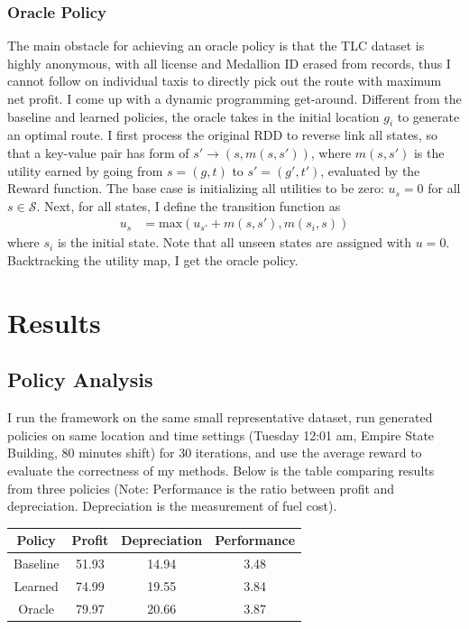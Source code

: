 \documentclass[letterpaper, 10 pt, conference]{ieeeconf}
\begin{document}
\subsubsection{Oracle Policy}
The main obstacle for achieving an oracle policy is that the TLC dataset is highly anonymous, with all license and Medallion ID erased from records, thus I cannot follow on individual taxis to directly pick out the route with maximum net profit. I come up with a dynamic programming get-around. Different from the baseline and learned policies, the oracle takes in the initial location $g_i$ to generate an optimal route. I first process the original RDD to reverse link all states, so that a key-value pair has form of $s'\to(s,m(s,s'))$, where $m(s,s')$ is the utility earned by going from $s=(g,t)$ to $s'=(g',t')$, evaluated by the Reward function. The base case is initializing all utilities to be zero: $u_s=0$ for all $s\in\mathcal{S}$. Next, for all states, I define the transition function as
\begin{align}
u_s &= \text{max}(u_{s'}+m(s, s'), m(s_i, s))
\end{align}
where $s_i$ is the initial state. Note that all unseen states are assigned with $u=0$. Backtracking the utility map, I get the oracle policy.
\section{Results}
\subsection{Policy Analysis}
I run the framework on the same small representative dataset, run generated policies on same location and time settings (Tuesday 12:01 am, Empire State Building, 80 minutes shift) for 30 iterations, and use the average reward to evaluate the correctness of my methods. Below is the table comparing results from three policies (Note: Performance is the ratio between profit and depreciation. Depreciation is the measurement of fuel cost).
\begin{center}
\begin{tabular}{|c||c|c|c|}
\hline
Policy & Profit & Depreciation & Performance \\ \hline
Baseline & 51.93 & 14.94 & 3.48 \\    \hline
Learned & 74.99 & 19.55 & 3.84 \\    \hline
Oracle & 79.97 & 20.66 & 3.87 \\    \hline
\end{tabular}
\end{center}
\end{document}
